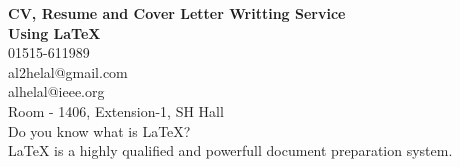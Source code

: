 \documentclass{article}
\begin{document}
\vspace*{\fill}
\begin{center}
 \LARGE{\textbf{CV, Resume and Cover Letter Writting Service \\Using \LaTeX{}}}
\\
\vspace{2cm}
 \faPhone{} 01515-611989\\
  \faEnvelope{} al2helal@gmail.com\\
  \faEnvelope{} alhelal@ieee.org\\
  \faHome{} Room - 1406, Extension-1, SH Hall
\\
\vspace{2cm}
Do you know what is \LaTeX{}?\\
\LaTeX{} is a highly qualified and powerfull document preparation system.
\end{center}
\vspace*{\fill}
 
\end{document}
